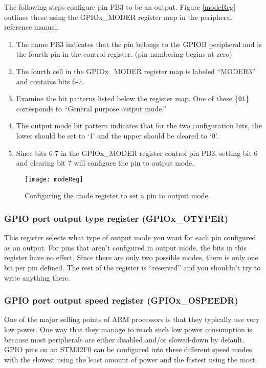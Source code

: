 \documentclass[11pt,fleqn]{book} %
\begin{document}
\begin{example}
    The following steps configure pin PB3 to be an output. Figure \vref{modeReg} outlines these using the GPIOx\_MODER register map in the peripheral reference manual.
    \begin{enumerate}
        \item The name PB3 indicates that the pin belongs to the GPIOB peripheral and is the fourth pin in the control register. (pin numbering begins at zero)
        \item The fourth cell in the GPIOx\_MODER register map is labeled ``MODER3'' and contains bits 6-7.
        \item Examine the bit patterns listed below the register map. One of these \{\texttt{01}\} corresponds to ``General purpose output mode.''
        \item The output mode bit pattern indicates that for the two configuration bits, the lower should be set to `1' and the upper should be cleared to `0'.
        \item Since bits 6-7 in the GPIOx\_MODER register control pin PB3, setting bit 6 and clearing bit 7 will configure the pin to output mode. 
    \end{enumerate}  
\end{example}

\begin{figure}[]
    \centering\texttt{[image: modeReg]}
    \caption{Configuring the mode register to set a pin to output mode.}
    \label{modeReg}
\end{figure}

\subsubsection{GPIO port output type register (GPIOx\_OTYPER)}
This register selects what type of output mode you want for each pin configured as an output. For pins that aren't configured in output mode, the bits in this register have no effect. Since there are only two possible modes, there is only one bit per pin defined. The rest of the register is ``reserved'' and you shouldn't try to write anything there.

\subsubsection{GPIO port output speed register (GPIOx\_OSPEEDR)}
One of the major selling points of ARM processors is that they typically use very low power. One way that they manage to reach such low power consumption is because most peripherals are either disabled and/or slowed-down by default. GPIO pins on an STM32F0 can be configured into three different speed modes, with the slowest using the least amount of power and the fastest using the most.
\end{document}
